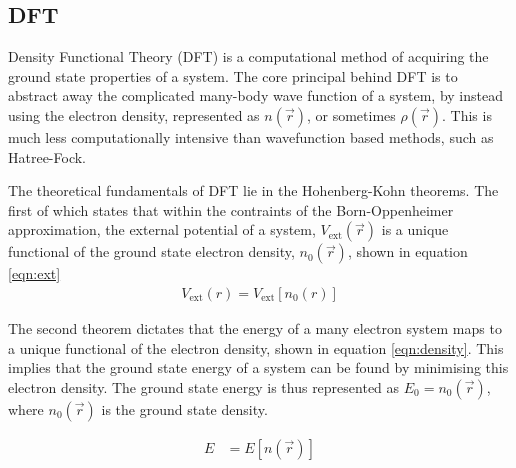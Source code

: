 \documentclass[10pt,a4paper,twocolumn,twoside]{extarticle}
\begin{document}
\subsection{DFT}
Density Functional Theory (DFT) is a computational method of acquiring the ground state properties of a system. 
The core principal behind DFT is to abstract away the complicated many-body wave function of a system, by instead using the electron density, represented as $n(\vec{r})$, or sometimes $\rho(\vec{r})$. This is much less computationally intensive than wavefunction based methods, such as Hatree-Fock. 

The theoretical fundamentals of DFT lie in the Hohenberg-Kohn theorems.
The first of which states that within the contraints of the Born-Oppenheimer approximation, the external potential of a system, $V_{\text{ext}}(\vec{r})$ is a unique functional of the ground state electron density, $n_0(\vec{r})$, shown in equation \ref{eqn:ext}
\begin{align}
	\label{eqn:ext}
	V_{\text{ext}}(r) = V_{\text{ext}}[n_0(r)] 
\end{align}

The second theorem dictates that the energy of a many electron system maps to a unique functional of the electron density, shown in equation \ref{eqn:density}. This implies that the ground state energy of a system can be found  by minimising this electron density. The ground state energy is thus represented as ${E_0 = n_0(\vec{r})}$, where $n_0(\vec{r})$ is the ground state density.  

\begin{align}
	\label{eqn:density}
	E &= E[n(\vec{r})]
\end{align}


\end{document}
